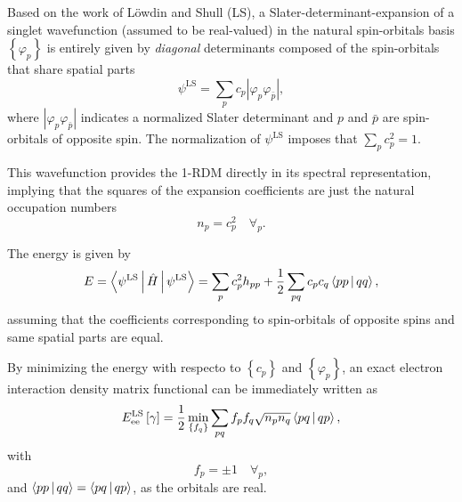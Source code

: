 \begin{enumerate}
        Based on the work of Löwdin and Shull (LS),
        a Slater-determinant-expansion of a singlet wavefunction (assumed to be
        real-valued) in the natural spin-orbitals basis $\left\{ \varphi_p \right\}$ 
        is entirely given by \textit{diagonal} determinants composed of the
        spin-orbitals that share spatial parts 
        \begin{equation}
            \psi^{\text{LS}} =
            \sum_{p} c_p \left| \varphi_p \varphi_{\bar{p}} \right|
            ,
        \end{equation}
        where $\left| \varphi_p \varphi_{\bar{p}} \right|$ indicates a 
        normalized Slater determinant and $p$ and $\bar{p}$ are
        spin-orbitals of opposite spin.
        The normalization of $\psi^{\text{LS}}$ imposes
        that $\displaystyle\sum_{p} c_p^{2} = 1$.

        This wavefunction provides the 1-RDM directly in its spectral 
        representation, implying that the squares of the expansion 
        coefficients are just the natural occupation numbers
        \begin{equation}
            n_p = c_p^2\quad \forall_p
            .
        \end{equation}

        The energy is given by 
        \begin{equation}
            E = \Braket{\psi^{\text{LS}} | \hat{H} | \psi^{\text{LS}}} =
            \sum_{p} c_p^2 h_{pp} + \frac{1}{2} \sum_{pq} 
            c_p c_q \Braket{pp | qq}
            ,
        \end{equation}
        assuming that the coefficients corresponding to spin-orbitals of opposite
        spins and same spatial parts are equal.

        By minimizing the energy with respecto to $\left\{ c_p \right\}$ and
        $\left\{ \varphi_p \right\}$, an exact electron interaction density
        matrix functional can be immediately written as 
        \begin{equation} \label{eq:LS-functional}
            E_{\text{ee}}^{\text{LS}} \left[ \fordm \right] =
            \frac{1}{2} \min_{ \left\{ f_q \right\}} \sum_{pq}
            f_p f_q \sqrt{n_p n_q} \Braket{pq | qp}
            ,
        \end{equation}
        with 
        \begin{equation}
            f_p = \pm 1\quad \forall_p
            ,
        \end{equation}
        and $ \Braket{pp | qq} = \Braket{pq | qp}$, as the orbitals are real.


\end{enumerate}
